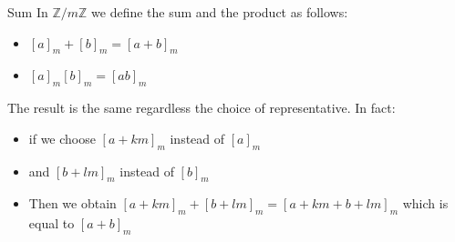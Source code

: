 \begin{parag}{Sum}
    In $ \mathbb{Z}/ m \mathbb{Z}$ we define the sum and the product as follows:
    \begin{itemize}
        \item $[a]_m + [b]_m = [a + b]_m$
        \item $[a]_m[b]_m = [ab]_m$
    \end{itemize}
    The result is the same regardless the choice of representative. In fact:
    \begin{itemize}
        \item if we choose $[a + km]_m$ instead of $[a]_m$
        \item and $[b + lm]_m$ instead of $[b]_m$
        \item Then we obtain $[a + km]_m + [b + lm]_m = [a + km + b + lm]_m$ which is equal to $[a + b]_m$
    \end{itemize}

\end{parag}

